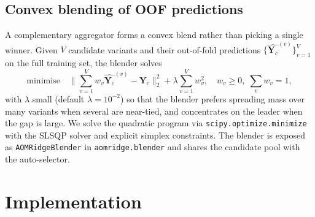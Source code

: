 \documentclass[11pt,a4paper]{article}
\newcommand{\Yc}{\mathbf{Y}_{\!c}}
\begin{document}
\subsection{Convex blending of OOF predictions}\label{sec:method-blender}

A complementary aggregator forms a convex blend rather than picking a
single winner. Given $V$ candidate variants and their out-of-fold
predictions $\{\hat{\Yc}^{(v)}\}_{v=1}^V$ on the full training set,
the blender solves
\begin{equation}
\mathrm{minimise}\quad
\big\| \sum_{v=1}^V w_v\hat{\Yc}^{(v)} - \Yc\big\|_2^2
+ \lambda \sum_{v=1}^V w_v^2,
\quad
w_v\geq 0,\;\sum_v w_v = 1,
\label{eq:blender}
\end{equation}
with $\lambda$ small (default $\lambda=10^{-2}$) so that the blender
prefers spreading mass over many variants when several are near-tied,
and concentrates on the leader when the gap is large. We solve the
quadratic program via \texttt{scipy.optimize.minimize} with the SLSQP
solver and explicit simplex constraints. The blender is exposed as
\texttt{AOMRidgeBlender} in \texttt{aomridge.blender} and shares the
candidate pool with the auto-selector.

\section{Implementation}\label{sec:implementation}
\end{document}
